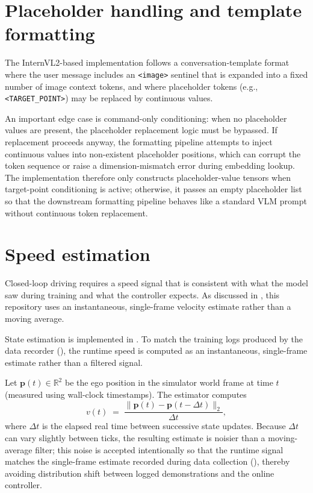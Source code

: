\section{Placeholder handling and template formatting}
\label{sec:placeholder-handling}
The InternVL2-based implementation follows a conversation-template format where the user message includes an \texttt{<image>} sentinel that is expanded into a fixed number of image context tokens, and where placeholder tokens (e.g., \texttt{<TARGET\_POINT>}) may be replaced by continuous values.

An important edge case is command-only conditioning: when no placeholder values are present, the placeholder replacement logic must be bypassed. If replacement proceeds anyway, the formatting pipeline attempts to inject continuous values into non-existent placeholder positions, which can corrupt the token sequence or raise a dimension-mismatch error during embedding lookup. The implementation therefore only constructs placeholder-value tensors when target-point conditioning is active; otherwise, it passes an empty placeholder list so that the downstream formatting pipeline behaves like a standard VLM prompt without continuous token replacement.

\section{Speed estimation}
\label{sec:state-estimation}
Closed-loop driving requires a speed signal that is consistent with what the model saw during training and what the controller expects. As discussed in , this repository uses an instantaneous, single-frame velocity estimate rather than a moving average.

State estimation is implemented in . To match the training logs produced by the data recorder (), the runtime speed is computed as an instantaneous, single-frame estimate rather than a filtered signal.

Let $\mathbf{p}(t)\in\mathbb{R}^2$ be the ego position in the simulator world frame at time $t$ (measured using wall-clock timestamps). The estimator computes
\begin{equation}
 v(t) \;=\; \frac{\lVert \mathbf{p}(t)-\mathbf{p}(t-\Delta t) \rVert_2}{\Delta t},
\end{equation}
where $\Delta t$ is the elapsed real time between successive state updates. Because $\Delta t$ can vary slightly between ticks, the resulting estimate is noisier than a moving-average filter; this noise is accepted intentionally so that the runtime signal matches the single-frame estimate recorded during data collection (), thereby avoiding distribution shift between logged demonstrations and the online controller.

